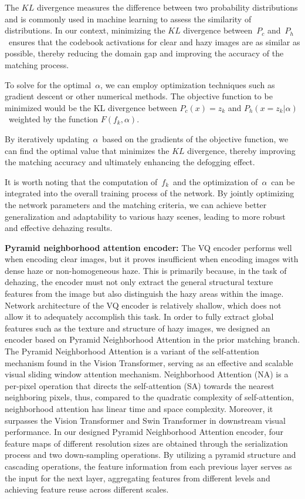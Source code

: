\documentclass[lettersize,journal]{IEEEtran}
\begin{document}
The $KL$ divergence measures the difference between two probability distributions and is commonly used in machine learning to assess the similarity of distributions. In our context, minimizing the $KL$ divergence between $P_{c}$ and $P_{h}$ ensures that the codebook activations for clear and hazy images are as similar as possible, thereby reducing the domain gap and improving the accuracy of the matching process.

To solve for the optimal $\alpha$, we can employ optimization techniques such as gradient descent or other numerical methods. The objective function to be minimized would be the KL divergence between $P_{c}(x) = z_{k}$ and $P_{h}(x = z_{k} | \alpha) $ weighted by  the function $F(f_{k}, \alpha)$.

By iteratively updating $\alpha$ based on the gradients of the objective function, we can find the optimal value that minimizes the $KL$ divergence, thereby improving the matching accuracy and ultimately enhancing the defogging effect.

It is worth noting that the computation of $f_{k}$ and the optimization of $\alpha$ can be integrated into the overall training process of the network. By jointly optimizing the network parameters and the matching criteria, we can achieve better generalization and adaptability to various hazy scenes, leading to more robust and effective dehazing results.

{\bf{Pyramid neighborhood attention encoder:}}
The VQ encoder performs well when encoding clear images, but it proves insufficient when encoding images with dense haze or non-homogeneous haze. This is primarily because, in the task of dehazing, the encoder must not only extract the general structural texture features from the image but also distinguish the hazy areas within the image. Network architecture of the VQ encoder is relatively shallow, which does not allow it to adequately accomplish this task. In order to fully extract global features such as the texture and structure of hazy images, we designed an encoder based on Pyramid Neighborhood Attention in the prior matching branch. The Pyramid Neighborhood Attention is a variant of the self-attention mechanism found in the Vision Transformer\cite{dosovitskiy2020image}, serving as an effective and scalable visual sliding window attention mechanism. Neighborhood Attention (NA)\cite{hassani2023neighborhood, hassani2022dilated} is a per-pixel operation that directs the self-attention (SA)\cite{vaswani2017attention} towards the nearest neighboring pixels, thus, compared to the quadratic complexity of self-attention, neighborhood attention has linear time and space complexity. Moreover, it surpasses the Vision Transformer and Swin Transformer\cite{liu2021swin} in downstream visual performance. In our designed Pyramid Neighborhood Attention encoder, four feature maps of different resolution sizes are obtained through the serialization process and two down-sampling operations. By utilizing a pyramid structure and cascading operations, the feature information from each previous layer serves as the input for the next layer, aggregating features from different levels and achieving feature reuse across different scales.
\end{document}
